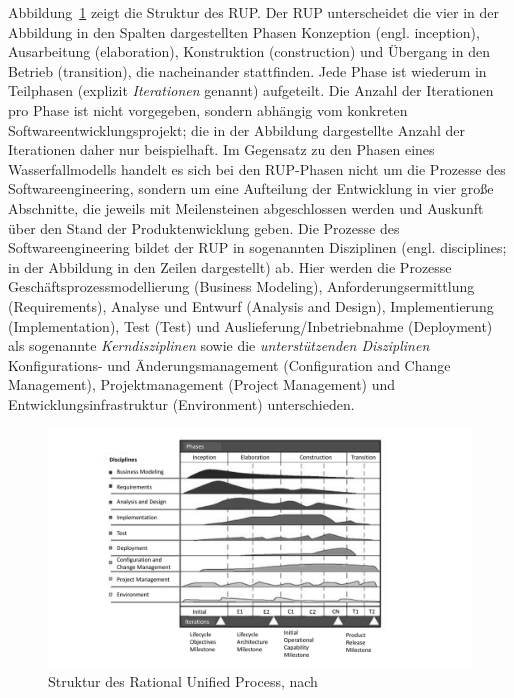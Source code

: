 Abbildung~\ref{fig:struktur_des_RUP} zeigt die Struktur des RUP. Der RUP unterscheidet die vier in der Abbildung in den Spalten dargestellten Phasen Konzeption (engl. inception), Ausarbeitung (elaboration), Konstruktion (construction) und Übergang in den Betrieb (transition), die nacheinander stattfinden. Jede Phase ist wiederum in Teilphasen (explizit \textit{Iterationen} 
genannt) aufgeteilt. Die Anzahl der Iterationen pro Phase ist nicht vorgegeben, sondern abhängig vom konkreten Softwareentwicklungsprojekt; die in der Abbildung dargestellte Anzahl der Iterationen daher nur beispielhaft. Im Gegensatz zu den Phasen eines Wasserfallmodells handelt es sich bei den RUP-Phasen nicht um die Prozesse des Softwareengineering, sondern um eine Aufteilung der Entwicklung in vier große Abschnitte, die jeweils mit Meilensteinen abgeschlossen werden und Auskunft über den Stand der Produktenwicklung geben. Die Prozesse des Softwareengineering bildet der RUP in sogenannten Disziplinen (engl. disciplines; in der Abbildung in den Zeilen dargestellt) ab. Hier werden die Prozesse Geschäftsprozessmodellierung (Business Modeling), Anforderungsermittlung (Requirements), Analyse und Entwurf (Analysis and Design), Implementierung (Implementation), Test (Test) und Auslieferung/Inbetriebnahme (Deployment) als sogenannte \textit{Kerndisziplinen}  sowie die \textit{unterstützenden Disziplinen} 
Konfigurations- und Änderungs\-manage\-ment (Configuration and Change Management), Projekt\-manage\-ment (Project Manage\-ment) und Entwicklungsinfrastruktur (Environment) unterschieden.

\vspace{-2mm} %

\begin{figure}[h!]
	\centering
	\includegraphics[width=\textwidth]{Bilder/Kapitel-2/StrukturRUP.pdf}
	\caption[Struktur des Rational Unified Process]{Struktur des Rational Unified Process, nach \cite[8]{shu08}}
	\label{fig:struktur_des_RUP}
\end{figure}

